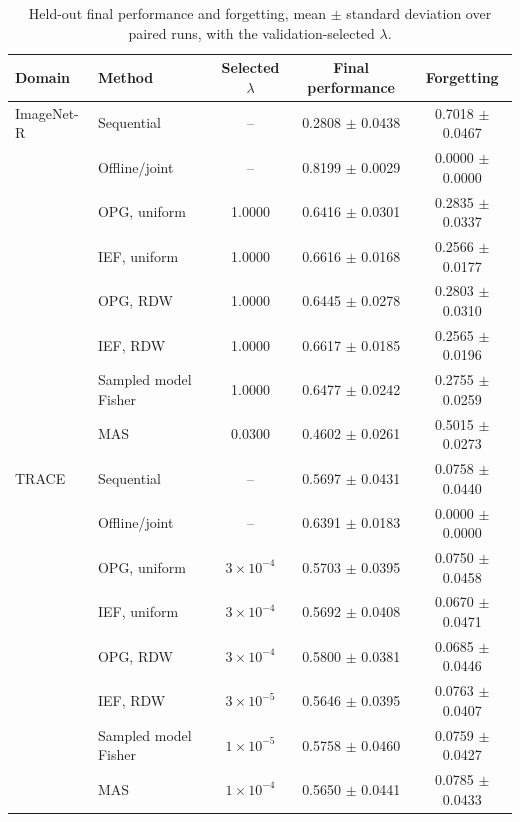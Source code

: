 \begin{table}[H]
\caption{Held-out final performance and forgetting, mean $\pm$ standard deviation over paired runs, with the validation-selected $\lambda$.}
\label{tab:confirmatory-main}
\centering
\small
\begin{tabular}{llccc}
\toprule
Domain & Method & Selected $\lambda$ & Final performance & Forgetting \\
\midrule
ImageNet-R & Sequential & -- & 0.2808 $\pm$ 0.0438 & 0.7018 $\pm$ 0.0467 \\
 & Offline/joint & -- & 0.8199 $\pm$ 0.0029 & 0.0000 $\pm$ 0.0000 \\
 & OPG, uniform & 1.0000 & 0.6416 $\pm$ 0.0301 & 0.2835 $\pm$ 0.0337 \\
 & IEF, uniform & 1.0000 & 0.6616 $\pm$ 0.0168 & 0.2566 $\pm$ 0.0177 \\
 & OPG, RDW & 1.0000 & 0.6445 $\pm$ 0.0278 & 0.2803 $\pm$ 0.0310 \\
 & IEF, RDW & 1.0000 & 0.6617 $\pm$ 0.0185 & 0.2565 $\pm$ 0.0196 \\
 & Sampled model Fisher & 1.0000 & 0.6477 $\pm$ 0.0242 & 0.2755 $\pm$ 0.0259 \\
 & MAS & 0.0300 & 0.4602 $\pm$ 0.0261 & 0.5015 $\pm$ 0.0273 \\
\midrule
TRACE & Sequential & -- & 0.5697 $\pm$ 0.0431 & 0.0758 $\pm$ 0.0440 \\
 & Offline/joint & -- & 0.6391 $\pm$ 0.0183 & 0.0000 $\pm$ 0.0000 \\
 & OPG, uniform & $3\times 10^{-4}$ & 0.5703 $\pm$ 0.0395 & 0.0750 $\pm$ 0.0458 \\
 & IEF, uniform & $3\times 10^{-4}$ & 0.5692 $\pm$ 0.0408 & 0.0670 $\pm$ 0.0471 \\
 & OPG, RDW & $3\times 10^{-4}$ & 0.5800 $\pm$ 0.0381 & 0.0685 $\pm$ 0.0446 \\
 & IEF, RDW & $3\times 10^{-5}$ & 0.5646 $\pm$ 0.0395 & 0.0763 $\pm$ 0.0407 \\
 & Sampled model Fisher & $1\times 10^{-5}$ & 0.5758 $\pm$ 0.0460 & 0.0759 $\pm$ 0.0427 \\
 & MAS & $1\times 10^{-4}$ & 0.5650 $\pm$ 0.0441 & 0.0785 $\pm$ 0.0433 \\
\bottomrule
\end{tabular}
\end{table}

